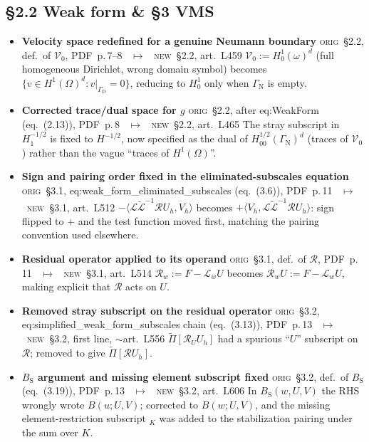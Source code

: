 \documentclass[11pt]{article}
\newcommand{\Orig}{\textcolor{origc}{\footnotesize\textsc{orig}}}
\newcommand{\New}{\textcolor{newc}{\footnotesize\textsc{new}}}
\newcommand{\code}[1]{\textcolor{newc}{\ttfamily\small #1}}
\newcommand{\pdfp}[1]{PDF~p.\,#1}
\newcommand{\artl}[1]{art.\ L#1}       %
\newcommand{\ch}[4]{%
  \item \textbf{#1}\newline
    {\footnotesize\Orig\ #2 \ \textcolor{locc}{$\longmapsto$} \ \New\ #3}\newline
    #4}
\begin{document}
\subsection{\S2.2 Weak form \& \S3 VMS}
\begin{itemize}
\ch{Velocity space redefined for a genuine Neumann boundary}
   {\S2.2, def.\ of $\mathcal V_0$, \pdfp{7}--8}
   {\S2.2, \artl{459}}
   {$\mathcal V_0:=H^1_0(\omega)^d$ (full homogeneous Dirichlet, wrong domain symbol) becomes
    $\{v\in H^1(\Omega)^d:v|_{\Gamma_{\mathrm D}}=0\}$, reducing to $H^1_0$ only when
    $\Gamma_{\mathrm N}$ is empty.}
\ch{Corrected trace/dual space for $g$}
   {\S2.2, after \code{eq:WeakForm} (eq.~(2.13)), \pdfp{8}}
   {\S2.2, \artl{465}}
   {The stray subscript in $H_1^{-1/2}$ is fixed to $H^{-1/2}$, now specified as the dual of
    $H^{1/2}_{00}(\Gamma_{\mathrm N})^d$ (traces of $\mathcal V_0$) rather than the vague ``traces of
    $H^1(\Omega)$''.}
\ch{Sign and pairing order fixed in the eliminated-subscales equation}
   {\S3.1, \code{eq:weak\_form\_eliminated\_subscales} (eq.~(3.6)), \pdfp{11}}
   {\S3.1, \artl{512}}
   {$-\langle\mathcal L\widetilde{\mathcal L}^{-1}\mathcal R U_h,V_h\rangle$ becomes
    $+\langle V_h,\mathcal L\widetilde{\mathcal L}^{-1}\mathcal R U_h\rangle$: sign flipped to $+$ and
    the test function moved first, matching the pairing convention used elsewhere.}
\ch{Residual operator applied to its operand}
   {\S3.1, def.\ of $\mathcal R$, \pdfp{11}}
   {\S3.1, \artl{514}}
   {$\mathcal R_w:=F-\mathcal L_wU$ becomes $\mathcal R_wU:=F-\mathcal L_wU$, making explicit that
    $\mathcal R$ acts on $U$.}
\ch{Removed stray subscript on the residual operator}
   {\S3.2, \code{eq:simplified\_weak\_form\_subscales} chain (eq.~(3.13)), \pdfp{13}}
   {\S3.2, first line, $\sim$\artl{556}}
   {$\widetilde\Pi[\mathcal R_UU_h]$ had a spurious ``$U$'' subscript on $\mathcal R$; removed to give
    $\widetilde\Pi[\mathcal R U_h]$.}
\ch{$B_{\mathrm S}$ argument and missing element subscript fixed}
   {\S3.2, def.\ of $B_{\mathrm S}$ (eq.~(3.19)), \pdfp{13}}
   {\S3.2, \artl{606}}
   {In $B_{\mathrm S}(w,U,V)$ the RHS wrongly wrote $B(u;U,V)$; corrected to $B(w;U,V)$, and the
    missing element-restriction subscript $_K$ was added to the stabilization pairing under the
    sum over $K$.}
\end{itemize}
\end{document}
